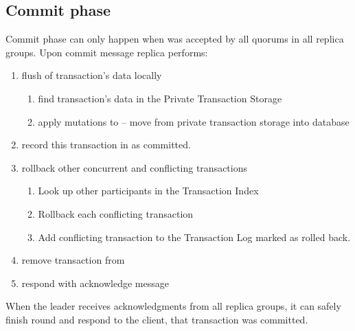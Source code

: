 
\subsection{Commit phase}
Commit phase can only happen when \txState was accepted by all quorums in all replica groups. Upon commit message replica performs:
\begin{enumerate}
\item flush of transaction’s data locally
\begin{enumerate}
   \item find transaction’s data in the Private Transaction Storage
   \item apply mutations to \database -- move \mutations from private transaction storage into database
   \end{enumerate}
\item record this transaction in \txLog as committed.
\item rollback other concurrent and conflicting transactions
 \begin{enumerate}
   \item Look up other participants in the Transaction Index
   \item Rollback each conflicting transaction
   \item Add conflicting transaction to the Transaction Log marked as rolled back.
  \end{enumerate}
\item remove transaction from \txIndex
\item respond with acknowledge message
\end{enumerate}

When the leader receives acknowledgments from all replica groups, it can safely finish \mpt round and respond to the client, that transaction was committed.


